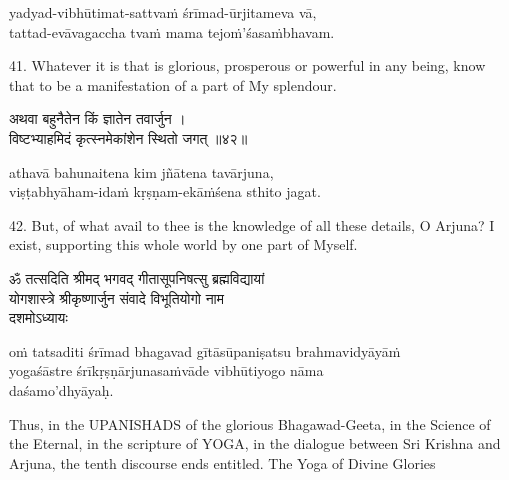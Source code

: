 \begin{transliteration}
yadyad-vibhūtimat-sattvaṁ śrīmad-ūrjitameva vā, \\
tattad-evāvagaccha tvaṁ mama tejoṁ'śasaṁbhavam.
\end{transliteration}

41. Whatever it is that is glorious, prosperous or powerful in any being, know
that to be a manifestation of a part of My splendour.

\begin{gitaverse}
अथवा बहुनैतेन किं ज्ञातेन तवार्जुन । \\
विष्टभ्याहमिदं कृत्स्नमेकांशेन स्थितो जगत् ॥४२॥
\end{gitaverse}

\begin{transliteration}
athavā bahunaitena kim jñātena tavārjuna, \\
viṣṭabhyāham-idaṁ kṛṣṇam-ekāṁśena sthito jagat.
\end{transliteration}

42. But, of what avail to thee is the knowledge of all these details, O Arjuna?
I exist, supporting this whole world by one part of Myself.

\begin{gitaverse}
ॐ तत्सदिति श्रीमद् भगवद् गीतासूपनिषत्सु ब्रह्मविद्यायां \\
योगशास्त्रे श्रीकृष्णार्जुन संवादे विभूतियोगो नाम \\
दशमोऽध्यायः
\end{gitaverse}

\begin{transliteration}
oṁ tatsaditi śrīmad bhagavad gītāsūpaniṣatsu brahmavidyāyāṁ \\
yogaśāstre śrīkṛṣṇārjunasaṁvāde vibhūtiyogo nāma \\
daśamo'dhyāyaḥ.
\end{transliteration}

Thus, in the UPANISHADS of the glorious Bhagawad-Geeta, in the Science of the
Eternal, in the scripture of YOGA, in the dialogue between Sri Krishna and
Arjuna, the tenth discourse ends entitled. The Yoga of Divine Glories
